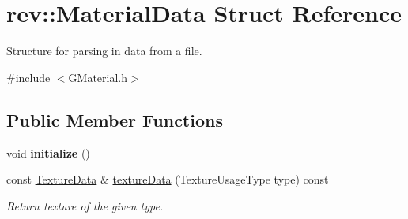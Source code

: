 \hypertarget{structrev_1_1_material_data}{}\section{rev\+::Material\+Data Struct Reference}
\label{structrev_1_1_material_data}


Structure for parsing in data from a file.  




{\ttfamily \#include $<$G\+Material.\+h$>$}

\subsection*{Public Member Functions}
\begin{DoxyCompactItemize}
\item 
\mbox{\label{structrev_1_1_material_data_af8b0e2db7f48782aac315184ac45ce13}} 
void {\bfseries initialize} ()
\item 
\mbox{\label{structrev_1_1_material_data_a6d66c9aa56be6c9c60d1303e921d5f04}} 
const \mbox{\hyperlink{structrev_1_1_texture_data}{Texture\+Data}} \& \mbox{\hyperlink{structrev_1_1_material_data_a6d66c9aa56be6c9c60d1303e921d5f04}{texture\+Data}} (Texture\+Usage\+Type type) const
\begin{DoxyCompactList}\small\item\em Return texture of the given type. \end{DoxyCompactList}\end{DoxyCompactItemize}
